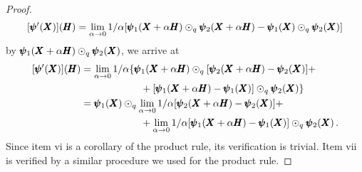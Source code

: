 {\begin{proof}
\begin{equation*}
[\pmb{\psi}'(\pmb{X})](\pmb{H})=\lim_{\alpha\to 0}1/\alpha[\pmb{\psi}_1(\pmb{X}+\alpha\pmb{H})\odot_q\pmb{\psi}_2(\pmb{X}+\alpha\pmb{H})-\pmb{\psi}_1(\pmb{X})\odot_q\pmb{\psi}_2(\pmb{X})]
\end{equation*}
by $\pmb{\psi}_1(\pmb{X}+\alpha\pmb{H})\odot_{q}\pmb{\psi}_2(\pmb{X})$, we arrive at
\begin{align*}
[\pmb{\psi}'(\pmb{X})](\pmb{H})&=\lim_{\alpha\to 0}1/\alpha\{ \pmb{\psi}_1(\pmb{X}+\alpha\pmb{H})\odot_{q}[\pmb{\psi}_2(\pmb{X}+\alpha\pmb{H})-\pmb{\psi}_2(\pmb{X})] +\\
& \qquad\qquad\qquad+[\pmb{\psi}_1(\pmb{X}+\alpha\pmb{H})-\pmb{\psi}_1(\pmb{X})]\odot_q\pmb{\psi}_2(\pmb{X})\}\\
&= \pmb{\psi}_1(\pmb{X})\odot_{q}\lim_{\alpha\to 0}1/\alpha[\pmb{\psi}_2(\pmb{X}+\alpha\pmb{H})-\pmb{\psi}_2(\pmb{X})] +\\
& \qquad\qquad\qquad+\lim_{\alpha\to 0}1/\alpha[\pmb{\psi}_1(\pmb{X}+\alpha\pmb{H})-\pmb{\psi}_1(\pmb{X})]\odot_q\pmb{\psi}_2(\pmb{X})\,.
\end{align*}
Since item vi is a corollary of the product rule, its verification is trivial. Item vii is verified by a similar procedure we used for the product rule. 
\end{proof}}

